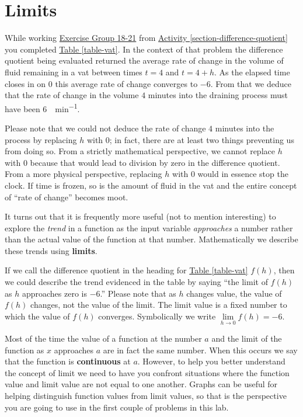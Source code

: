\documentclass[10pt,oneside,]{book}
\newcommand{\terminology}[1]{\textbf{#1}}
\theoremstyle{plain}
\theoremstyle{definition}
\numberwithin{equation}{section}
\newcommand{\fe}[2]{#1\mathopen{}\left(#2\right)\mathclose{}}
\begin{document}
\section[Limits]{Limits}\label{section-limits}
While working \hyperlink{exercisegroup-vat}{Exercise Group 18-21} from \hyperref[section-difference-quotient]{Activity \ref{section-difference-quotient}} you completed \hyperref[table-vat]{Table \ref{table-vat}}. In the context of that problem the difference quotient being evaluated returned the average rate of change in the volume of fluid remaining in a vat between times \(t=4\) and \(t=4+h\). As the elapsed time closes in on \(0\) this average rate of change converges to \(-6\). From that we deduce that the rate of change in the volume \(4\) minutes into the draining process must have been \SI{6}{\gallon\per\minute}.%
\par
Please note that we could not deduce the rate of change \(4\) minutes into the process by replacing \(h\) with \(0\); in fact, there are at least two things preventing us from doing so. From a strictly mathematical perspective, we cannot replace \(h\) with \(0\) because that would lead to division by zero in the difference quotient. From a more physical perspective, replacing \(h\) with \(0\) would in essence stop the clock. If time is frozen, so is the amount of fluid in the vat and the entire concept of ``rate of change'' becomes moot.%
\par
It turns out that it is frequently more useful (not to mention interesting) to explore the \emph{trend} in a function as the input variable \emph{approaches} a number rather than the actual value of the function at that number. Mathematically we describe these trends using \terminology{limits}.%
\par
If we call the difference quotient in the heading for \hyperref[table-vat]{Table \ref{table-vat}} \(\fe{f}{h}\), then we could describe the trend evidenced in the table by saying ``the limit of \(\fe{f}{h}\) as \(h\) approaches zero is \(-6\).'' Please note that as \(h\) changes value, the value of \(\fe{f}{h}\) changes, not the value of the limit. The limit value is a fixed number to which the value of \(\fe{f}{h}\) converges. Symbolically we write \(\lim\limits_{h\to0}\fe{f}{h}=-6\).%
\par
Most of the time the value of a function at the number \(a\) and the limit of the function as \(x\) approaches \(a\) are in fact the same number. When this occurs we say that the function is \terminology{continuous} at \(a\). However, to help you better understand the concept of limit we need to have you confront situations where the function value and limit value are not equal to one another. Graphs can be useful for helping distinguish function values from limit values, so that is the perspective you are going to use in the first couple of problems in this lab.%
\typeout{************************************************}
\typeout{************************************************}
\end{document}
